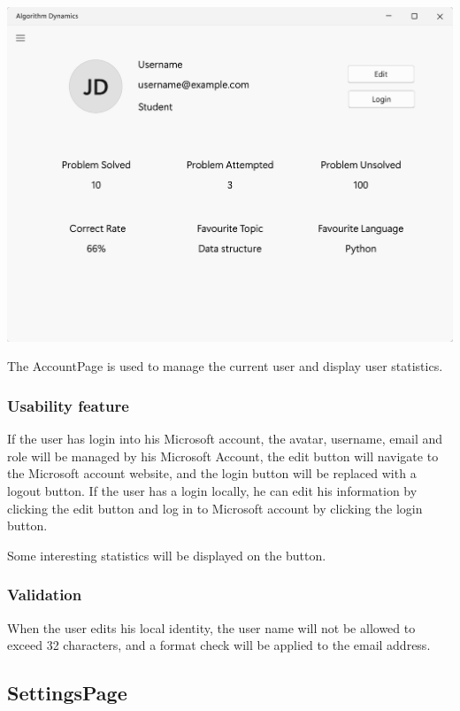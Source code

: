 \documentclass[a4paper]{report}
\begin{document}
\includegraphics[width=\textwidth, height=\textheight, keepaspectratio]{AccountPage-design}

The AccountPage is used to manage the current user and display user statistics.

\subsubsection{Usability feature}

If the user has login into his Microsoft account, the avatar, username, email and role will be managed by his Microsoft Account, the edit button will navigate to the Microsoft account website, and the login button will be replaced with a logout button. If the user has a login locally, he can edit his information by clicking the edit button and log in to Microsoft account by clicking the login button.

Some interesting statistics will be displayed on the button.

\subsubsection{Validation}

When the user edits his local identity, the user name will not be allowed to exceed 32 characters, and a format check will be applied to the email address.

\subsection{SettingsPage}
\end{document}
